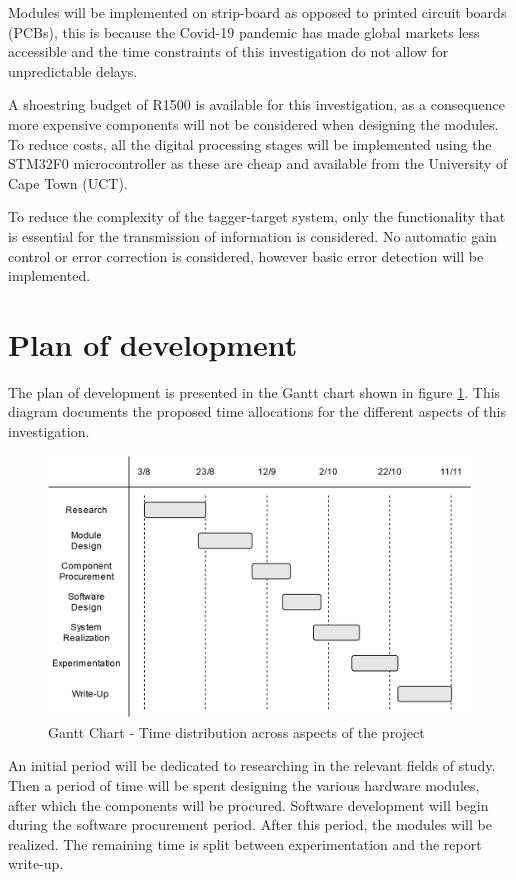 Modules will be implemented on strip-board as opposed to printed circuit boards (PCBs), this is because the Covid-19 pandemic has made global markets less accessible and the time constraints of this investigation do not allow for unpredictable delays.

A shoestring budget of R1500 is available for this investigation, as a consequence more expensive components will not be considered when designing the modules. To reduce costs, all the digital processing stages will be implemented using the STM32F0 microcontroller as these are cheap and available from the University of Cape Town (UCT).

To reduce the complexity of the tagger-target system, only the functionality that is essential for the transmission of information is considered. No automatic gain control or error correction is considered, however basic error detection will be implemented.





\section{Plan of development}

The plan of development is presented in the Gantt chart shown in figure \ref{fig:gantt_chart}. This diagram documents the proposed time allocations for the different aspects of this investigation.

\begin{figure}[H]
	\centering
	\includegraphics[width=0.8\linewidth]{figures/introduction/gantt_chart.png}
	\caption{Gantt Chart - Time distribution across aspects of the project}
	\label{fig:gantt_chart}
\end{figure}

An initial period will be dedicated to researching in the relevant fields of study. Then a period of time will be spent designing the various hardware modules, after which the components will be procured. Software development will begin during the software procurement period. After this period, the modules will be realized. The remaining time is split between experimentation and the report write-up.